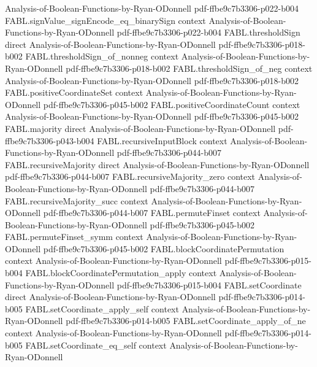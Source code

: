 \begin{theorem}
  {Analysis-of-Boolean-Functions-by-Ryan-ODonnell}
  {pdf-ffbe9c7b3306-p022-b004}
\proofstep
  {FABL.signValue_signEncode_eq_binarySign}
  {context}
  {Analysis-of-Boolean-Functions-by-Ryan-ODonnell}
  {pdf-ffbe9c7b3306-p022-b004}
\proofstep
  {FABL.thresholdSign}
  {direct}
  {Analysis-of-Boolean-Functions-by-Ryan-ODonnell}
  {pdf-ffbe9c7b3306-p018-b002}
\proofstep
  {FABL.thresholdSign_of_nonneg}
  {context}
  {Analysis-of-Boolean-Functions-by-Ryan-ODonnell}
  {pdf-ffbe9c7b3306-p018-b002}
\proofstep
  {FABL.thresholdSign_of_neg}
  {context}
  {Analysis-of-Boolean-Functions-by-Ryan-ODonnell}
  {pdf-ffbe9c7b3306-p018-b002}
\proofstep
  {FABL.positiveCoordinateSet}
  {context}
  {Analysis-of-Boolean-Functions-by-Ryan-ODonnell}
  {pdf-ffbe9c7b3306-p045-b002}
\proofstep
  {FABL.positiveCoordinateCount}
  {context}
  {Analysis-of-Boolean-Functions-by-Ryan-ODonnell}
  {pdf-ffbe9c7b3306-p045-b002}
\proofstep
  {FABL.majority}
  {direct}
  {Analysis-of-Boolean-Functions-by-Ryan-ODonnell}
  {pdf-ffbe9c7b3306-p043-b004}
\proofstep
  {FABL.recursiveInputBlock}
  {context}
  {Analysis-of-Boolean-Functions-by-Ryan-ODonnell}
  {pdf-ffbe9c7b3306-p044-b007}
\proofstep
  {FABL.recursiveMajority}
  {direct}
  {Analysis-of-Boolean-Functions-by-Ryan-ODonnell}
  {pdf-ffbe9c7b3306-p044-b007}
\proofstep
  {FABL.recursiveMajority_zero}
  {context}
  {Analysis-of-Boolean-Functions-by-Ryan-ODonnell}
  {pdf-ffbe9c7b3306-p044-b007}
\proofstep
  {FABL.recursiveMajority_succ}
  {context}
  {Analysis-of-Boolean-Functions-by-Ryan-ODonnell}
  {pdf-ffbe9c7b3306-p044-b007}
\proofstep
  {FABL.permuteFinset}
  {context}
  {Analysis-of-Boolean-Functions-by-Ryan-ODonnell}
  {pdf-ffbe9c7b3306-p045-b002}
\proofstep
  {FABL.permuteFinset_symm}
  {context}
  {Analysis-of-Boolean-Functions-by-Ryan-ODonnell}
  {pdf-ffbe9c7b3306-p045-b002}
\proofstep
  {FABL.blockCoordinatePermutation}
  {context}
  {Analysis-of-Boolean-Functions-by-Ryan-ODonnell}
  {pdf-ffbe9c7b3306-p015-b004}
\proofstep
  {FABL.blockCoordinatePermutation_apply}
  {context}
  {Analysis-of-Boolean-Functions-by-Ryan-ODonnell}
  {pdf-ffbe9c7b3306-p015-b004}
\proofstep
  {FABL.setCoordinate}
  {direct}
  {Analysis-of-Boolean-Functions-by-Ryan-ODonnell}
  {pdf-ffbe9c7b3306-p014-b005}
\proofstep
  {FABL.setCoordinate_apply_self}
  {context}
  {Analysis-of-Boolean-Functions-by-Ryan-ODonnell}
  {pdf-ffbe9c7b3306-p014-b005}
\proofstep
  {FABL.setCoordinate_apply_of_ne}
  {context}
  {Analysis-of-Boolean-Functions-by-Ryan-ODonnell}
  {pdf-ffbe9c7b3306-p014-b005}
\proofstep
  {FABL.setCoordinate_eq_self}
  {context}
  {Analysis-of-Boolean-Functions-by-Ryan-ODonnell}

\end{theorem}
